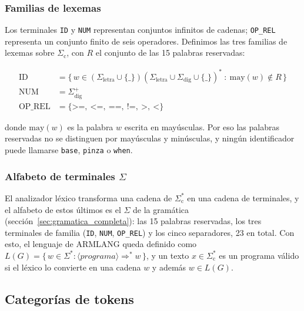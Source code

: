 \documentclass[10pt,a4paper]{article}
\newcommand{\nt}[1]{\ensuremath{\langle}\textit{#1}\ensuremath{\rangle}}   %
\newcommand{\tm}[1]{\texttt{#1}}                                          %
\begin{document}
\subsubsection*{Familias de lexemas}

Los terminales \tm{ID} y \tm{NUM} representan conjuntos infinitos de cadenas; \tm{OP\_REL}
representa un conjunto finito de seis operadores. Definimos las tres familias de lexemas
sobre $\Sigma_{\mathrm{c}}$, con $R$ el conjunto de las 15 palabras reservadas:

\begin{align*}
\mathrm{ID} &= \{\, w \in (\Sigma_{\text{letra}} \cup \{\texttt{\_}\})(\Sigma_{\text{letra}} \cup \Sigma_{\text{dig}} \cup \{\texttt{\_}\})^{*} \ :\ \mathrm{may}(w) \notin R \,\}\\
\mathrm{NUM} &= \Sigma_{\text{dig}}^{+}\\
\mathrm{OP\_REL} &= \{\texttt{>=},\ \texttt{<=},\ \texttt{==},\ \texttt{!=},\ \texttt{>},\ \texttt{<}\}
\end{align*}

donde $\mathrm{may}(w)$ es la palabra $w$ escrita en mayúsculas. Por eso las palabras
reservadas no se distinguen por mayúsculas y minúsculas, y ningún identificador puede
llamarse \tm{base}, \tm{pinza} o \tm{when}.

\subsubsection*{Alfabeto de terminales $\Sigma$}

El analizador léxico transforma una cadena de $\Sigma_{\mathrm{c}}^{*}$ en una cadena de
terminales, y el alfabeto de estos últimos es el $\Sigma$ de la gramática (sección~\ref{sec:gramatica_completa}):
las 15 palabras reservadas, los tres terminales de familia (\tm{ID}, \tm{NUM}, \tm{OP\_REL}) y los cinco
separadores, 23 en total. Con esto, el lenguaje de ARMLANG queda definido como
$L(G) = \{\, w \in \Sigma^{*} : \nt{programa} \Rightarrow^{*} w \,\}$, y un texto $x \in \Sigma_{\mathrm{c}}^{*}$
es un programa válido si el léxico lo convierte en una cadena $w$ y además $w \in L(G)$.

\subsection{Categorías de tokens}
\end{document}

